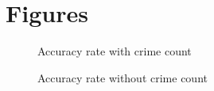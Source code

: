 \documentclass[12pt]{article}
\begin{document}
\section{Figures}

\begin{figure}[H]
 \caption{Accuracy rate with crime count}
\end{figure}


\begin{figure}[H]
 \caption{Accuracy rate without crime count}
\end{figure}
\end{document}

